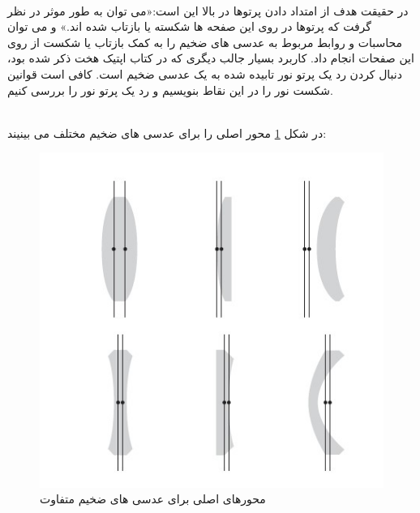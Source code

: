 \documentclass{article}
\begin{document}
\noindent\\
در حقیقت هدف از امتداد دادن پرتوها در بالا این است:«می توان به طور موثر در نظر گرفت که پرتوها در روی این صفحه ها شکسته یا بازتاب شده اند.» و می توان محاسبات و روابط مربوط به عدسی های ضخیم را به کمک بازتاب یا شکست از روی این صفحات انجام داد.
کاربرد بسیار جالب دیگری که در کتاب اپتیک هخت ذکر شده بود، دنبال کردن رد یک پرتو نور تابیده شده به یک عدسی ضخیم است. کافی است قوانین شکست نور را در این نقاط بنویسیم و رد یک پرتو نور را بررسی کنیم.
 
 \noindent\\
 در شکل 
 \ref{Fig3}
  محور اصلی را برای عدسی های ضخیم مختلف می بینیند:
 \begin{figure}[h]
 	\centering
 	\includegraphics[scale=0.8]{2.jpg}
 	\caption{محورهای اصلی برای عدسی های ضخیم متفاوت}
 	\label{Fig3}
 \end{figure}
\end{document}
